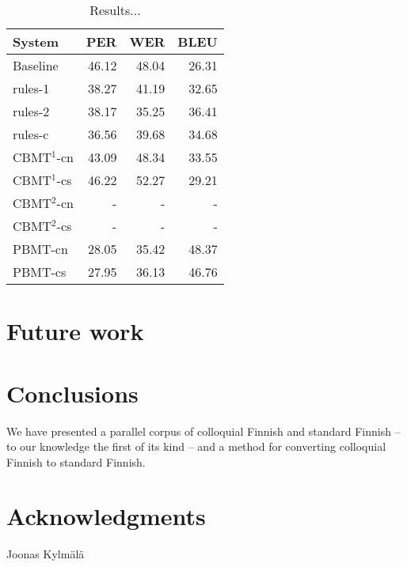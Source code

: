 \documentclass[11pt]{article}
\begin{document}
\begin{table}
  \centering
  \begin{tabular}{|l|r|r|r|}
     \hline
    \textbf{System} & \textbf{PER} & \textbf{WER} & \textbf{BLEU} \\
     \hline
     Baseline & 46.12 & 48.04 & 26.31 \\
     \hline
     rules-1 & 38.27 & 41.19 & 32.65 \\
     rules-2 & 38.17 & 35.25 & 36.41 \\
     rules-c & 36.56 & 39.68 & 34.68 \\
     \hline
     CBMT$^1$-cn & 43.09 & 48.34 & 33.55 \\
     CBMT$^1$-cs & 46.22 & 52.27 & 29.21 \\
     CBMT$^2$-cn & - & - & - \\
     CBMT$^2$-cs & - & - & - \\
     PBMT-cn & 28.05 & 35.42 & 48.37 \\
     PBMT-cs & 27.95 & 36.13 & 46.76 \\
     \hline
  \end{tabular}
  \label{table:results}
  \caption{Results...}
\end{table}

\section{Future work}

% 

\section{Conclusions}

We have presented a parallel corpus of colloquial Finnish and standard Finnish --
to our knowledge the first of its kind -- and a method for converting colloquial
Finnish to standard Finnish.


\section*{Acknowledgments}

Joonas Kylm\"{a}l\"{a}



\end{document}
